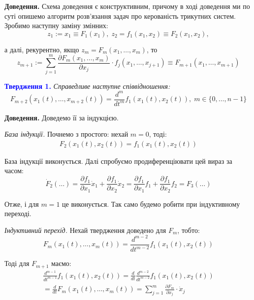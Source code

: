 \documentclass[oneside,solution]{karazin-control-assign}
\begin{document}
\textbf{Доведення.} Схема доведення є конструктивним, причому в ході доведення ми по суті опишемо алгоритм розв'язання задач про керованість трикутних систем. Зробимо наступну заміну змінних:
\begin{equation}
    z_1 := x_1 \equiv F_1(x_1), \; z_2 = f_1(x_1,x_2) \equiv F_2(x_1,x_2),
\end{equation}

а далі, рекурентно, якщо $z_m=F_m(x_1,\dots,x_m)$, то
\begin{equation}
    z_{m+1} := \sum_{j=1}^m \frac{\partial F_m(x_1,\dots,x_m)}{\partial x_j}\cdot f_j(x_1,\dots,x_{j+1}) \equiv F_{m+1}(x_1,\dots,x_{m+1})
\end{equation}

\textcolor{blue}{\textbf{Твердження 1.}} \textit{Справедливе наступне співвідношення:}
\begin{equation}
    F_{m+2}(x_1(t), \dots, x_{m+2}(t)) = \frac{d^{m}}{dt^{m}} f_1(x_1(t), x_2(t)), \; m \in \{0,\dots,n-1\}
\end{equation}

\textbf{Доведення.} Доведемо її за індукцією. 

\textit{База індукції.} Почнемо з простого: нехай $m=0$, тоді:
\begin{gather}
    F_2(x_1(t), x_2(t)) = f_1(x_1(t), x_2(t))
\end{gather}

База індукції виконується. Далі спробуємо продиференціювати цей вираз за часом:
\begin{equation}
    \dot{F}_2(\dots) = \frac{\partial f_1}{\partial x_1}\dot{x}_1 + \frac{\partial f_1}{\partial x_2}\dot{x}_2 = \frac{\partial f_1}{\partial x_1}f_1 + \frac{\partial f_1}{\partial x_2}f_2 = F_3(\dots)
\end{equation}

Отже, і для $m=1$ це виконується. Так само будемо робити при індуктивному переході.

\textit{Індуктивний перехід.} Нехай твердження доведено для $F_m$, тобто:
\begin{equation}
    F_m(x_1(t),\dots,x_m(t)) = \frac{d^{m-2}}{dt^{m-2}}f_1(x_1(t), x_2(t))
\end{equation}

Тоді для $F_{m+1}$ маємо:
\begin{gather}
    \frac{d^{m-1}}{dt^{m-1}}f_1(x_1(t), x_2(t)) = \frac{d}{dt} \frac{d^{m-2}}{dt^{m-2}}f_1(x_1(t), x_2(t)) \\
    = \frac{d}{dt}F_m(x_1(t), \dots, x_m(t)) = \sum_{j=1}^{m} \frac{\partial F_m}{\partial x_j} \cdot \dot{x}_j
\end{gather}
\end{document}
